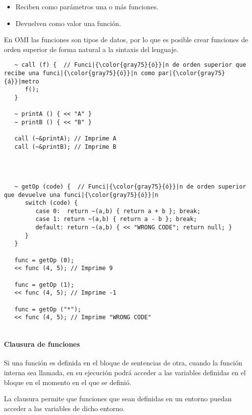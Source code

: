 \begin{itemize}
\item Reciben como parámetros una o más funciones.
\item Devuelven como valor una función.
\end{itemize}

En OMI las funciones son tipos de datos, por lo que es posible crear funciones de orden superior de
forma natural a la sintaxis del lenguaje. \\

\begin{lstlisting}
   ~ call (f) {  // Funci|{\color{gray75}{ó}}|n de orden superior que recibe una funci|{\color{gray75}{ó}}|n como par|{\color{gray75}{á}}|metro
      f();
   }
   
   ~ printA () { << "A" }
   ~ printB () { << "B" }
   
   call (~&printA); // Imprime A
   call (~&printB); // Imprime B
   
\end{lstlisting}

\hfill \\

\begin{lstlisting}
   ~ getOp (code) {  // Funci|{\color{gray75}{ó}}|n de orden superior que devuelve una funci|{\color{gray75}{ó}}|n
      switch (code) {
         case 0:  return ~(a,b) { return a + b }; break;
         case 1: return ~(a,b) { return a - b }; break;
         default: return ~(a,b) { << "WRONG CODE"; return null; }
      }
   }
   
   func = getOp (0);
   << func (4, 5); // Imprime 9
   
   func = getOp (1);
   << func (4, 5); // Imprime -1
   
   func = getOp ("*");
   << func (4, 5); // Imprime "WRONG CODE"
   
\end{lstlisting}

\paragraph{Clausura de funciones}
Si una función es definida en el bloque de sentencias de otra, cuando la función interna sea llamada, en su ejecución podrá 
acceder a las variables definidas en el bloque en el momento en el que se definió.

La clausura permite que funciones que sean definidas en un entorno puedan acceder a las variables de dicho entorno. \\

